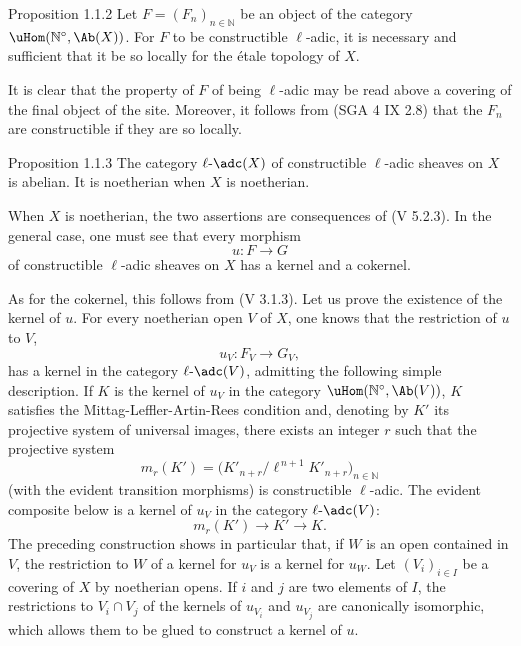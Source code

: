 \begin{statement}{Proposition 1.1.2}
Let \(F=(F_n)_{n\in\mathbb N}\) be an object of the category \(\uHom(\mathbb N^\circ,\Ab(X))\). For \(F\) to be constructible \(\ell\)-adic, it is necessary and sufficient that it be so locally for the étale topology of \(X\).
\end{statement}

\begin{prooftext}[Proof]
It is clear that the property of \(F\) of being \(\ell\)-adic may be read above a covering of the final object of the site. Moreover, it follows from (SGA 4 IX 2.8) that the \(F_n\) are constructible if they are so locally.
\end{prooftext}

\begin{statement}{Proposition 1.1.3}
The category \(\ell\text{-}\adc(X)\) of constructible \(\ell\)-adic sheaves on \(X\) is abelian. It is noetherian when \(X\) is noetherian.
\end{statement}

\begin{prooftext}[Proof]
When \(X\) is noetherian, the two assertions are consequences of (V 5.2.3). In the general case, one must see that every morphism
\[
u:F\longrightarrow G
\]
of constructible \(\ell\)-adic sheaves on \(X\) has a kernel and a cokernel.

As for the cokernel, this follows from (V 3.1.3). Let us prove the existence of the kernel of \(u\). For every noetherian open \(V\) of \(X\), one knows that the restriction of \(u\) to \(V\),
\[
u_V:F_V\longrightarrow G_V,
\]
has a kernel in the category \(\ell\text{-}\adc(V)\), admitting the following simple description. If \(K\) is the kernel of \(u_V\) in the category \(\uHom(\mathbb N^\circ,\Ab(V))\), \(K\) satisfies the Mittag-Leffler-Artin-Rees condition and, denoting by \(K'\) its projective system of universal images, there exists an integer \(r\) such that the projective system
\[
m_r(K')=\bigl(K'_{n+r}/\ell^{\,n+1}K'_{n+r}\bigr)_{n\in\mathbb N}
\]
(with the evident transition morphisms) is constructible \(\ell\)-adic. The evident composite below is a kernel of \(u_V\) in the category \(\ell\text{-}\adc(V)\):
\[
m_r(K')\longrightarrow K'\longrightarrow K.
\]
The preceding construction shows in particular that, if \(W\) is an open contained in \(V\), the restriction to \(W\) of a kernel for \(u_V\) is a kernel for \(u_W\). Let \((V_i)_{i\in I}\) be a covering of \(X\) by noetherian opens. If \(i\) and \(j\) are two elements of \(I\), the restrictions to \(V_i\cap V_j\) of the kernels of \(u_{V_i}\) and \(u_{V_j}\) are canonically isomorphic, which allows them to be glued to construct a kernel of \(u\).
\end{prooftext}

